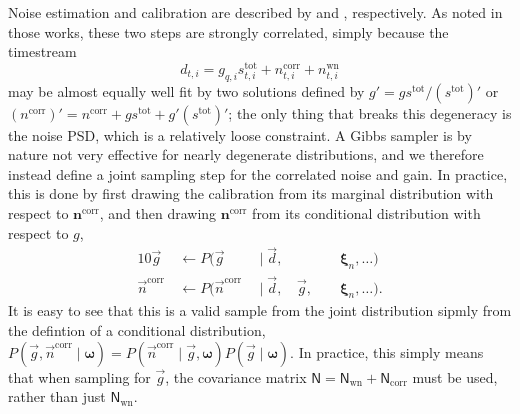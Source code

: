\documentclass[twocolumn]{../../common/aa}
\newcommand{\g}[0]{\vec{g}}
\newcommand{\ncorr}{\vec n^\mathrm{corr}}
\newcommand{\data}{\vec d}
\begin{document}
Noise estimation and calibration are described by \citet{bp06} and \citet{bp07}, respectively. As noted in those works, these two steps are strongly correlated, simply because the timestream
\begin{equation}
	d_{t,i}=g_{q,i}s_{t,i}^\mathrm{tot}+n_{t,i}^\mathrm{corr}+n_{t,i}^\mathrm{wn}
\end{equation}
may be almost equally well fit by two solutions defined by $g'=gs^\mathrm{tot}/(s^\mathrm{tot})'$ or ${(n^\mathrm{corr})'=n^\mathrm{corr}+gs^\mathrm{tot}+g'(s^\mathrm{tot})'}$; the only thing that breaks this degeneracy is the noise PSD, which is a relatively loose constraint. A Gibbs sampler is by nature not very effective for nearly degenerate distributions, and we therefore instead define a joint sampling step for the correlated noise and gain. In practice, this is done by first drawing the calibration from its marginal distribution with respect to $\boldsymbol n^\mathrm{corr}$, and then drawing $\boldsymbol n^\mathrm{corr}$ from its conditional distribution with respect to $g$,
\begin{alignat}{10}
	\g&\,\leftarrow P(\g&\,\mid\data, &\, &\,&\,\boldsymbol\xi_n,\ldots)
	\label{eq:gmarg}
	\\
	\ncorr&\,\leftarrow P(\ncorr&\,\mid\data, &\,\g, &\,&\,\boldsymbol\xi_n,\ldots).
	\label{eq:ncorr_only}
\end{alignat}
It is easy to see that this is a valid sample from the joint distribution sipmly from the defintion of a conditional distribution, $P(\g,\ncorr\mid\boldsymbol\omega)=P(\ncorr\mid\g,\boldsymbol\omega)P(\g\mid\boldsymbol\omega)$. In practice, this simply means that when sampling for $\g$, the covariance matrix $\mathsf N=\mathsf N_\textrm{wn}+\mathsf N_\textrm{corr}$ must be used, rather than just $\mathsf N_\mathrm{wn}$.
\end{document}
